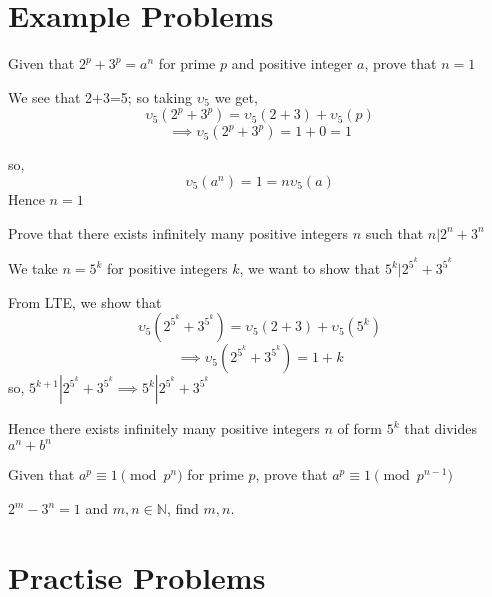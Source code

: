 \section{Example Problems}
\begin{example}
Given that $2^p+3^p=a^n$ for prime $p$ and positive integer $a$, prove that $n=1$
\end{example}

We see that 2+3=5; so taking $\upsilon_5$ we get,
$$\upsilon_5(2^p+3^p)=\upsilon_5(2+3)+\upsilon_5(p)$$
$$\implies \upsilon_5(2^p+3^p)=1+0=1$$

so, $$\upsilon_5 (a^n)=1=n\upsilon_5(a)$$
Hence $n=1$

\begin{example}
Prove that there exists infinitely many positive integers $n$ such that $n|2^n+3^n$
\end{example}
We take $n=5^k$ for positive integers $k$, we want to show that $5^k|2^{5^k}+3^{5^k}$

From LTE, we show that $$\upsilon_5(2^{5^k}+3^{5^k})=\upsilon_5(2+3)+\upsilon_5(5^k)$$
$$\implies \upsilon_5(2^{5^k}+3^{5^k})=1+k$$
so, $5^{k+1}|2^{5^k}+3^{5^k} \implies 5^{k}|2^{5^k}+3^{5^k}$

Hence there exists infinitely many positive integers $n$ of form $5^k$ that divides $a^n+b^n$

\begin{example}
Given that $a^p \equiv 1 \pmod {p^n}$ for prime $p$, prove that $a^p \equiv 1 \pmod {p^{n-1}}$
\end{example}

\begin{example}
$2^m-3^n=1$ and $m,n \in \mathbb{N}$, find $m,n$.
\end{example}
\section{Practise Problems}